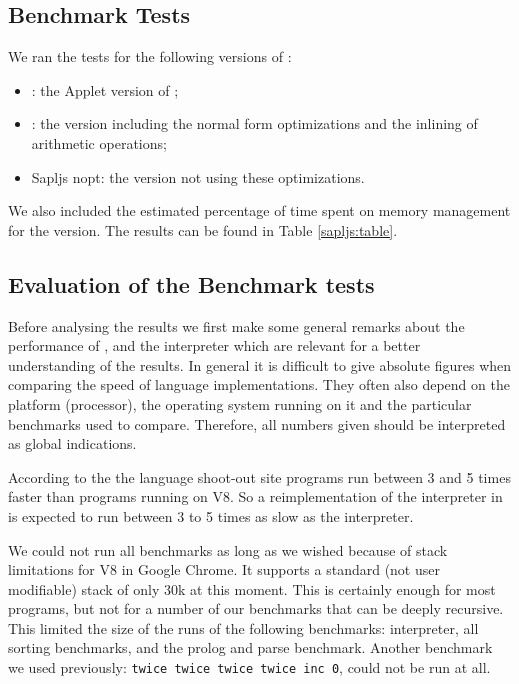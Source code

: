 \subsection{Benchmark Tests}
We ran the tests for the following versions of \Sapl: 
\begin{itemize}
\item{\Sapl}: the \Java Applet version of \Sapl;
\item{\Sapljs}: the \Sapljs version including the normal form optimizations and the inlining of arithmetic operations;
\item{\textsf{Sapljs nopt}}: the version not using these optimizations.
\end{itemize}
We also  included the estimated percentage of time spent on memory management for the \Sapljs version.
The results can be found in Table \ref{sapljs:table}.


\subsection{Evaluation of the Benchmark tests}
Before analysing the results we first make some general remarks about the performance of \Java, \JS and the \Sapl interpreter which are relevant for
a better understanding of the results. In general it is difficult to give absolute figures when comparing the speed of language implementations. 
They often also depend on the platform (processor), the operating system running on it and the particular benchmarks used to compare. 
Therefore, all numbers given should be interpreted as global indications. 

According to the the language shoot-out site \cite{SHOOTOUT} \Java 
programs run between 3 and 5 times faster than \JS programs running on V8. 
So a reimplementation of the \Sapl interpreter in \JS is expected to run between 3 to 5 times as slow as the \Sapl interpreter.

We could not run all benchmarks as long as we wished because of stack limitations for V8 \JS in Google Chrome. 
It supports a standard (not user modifiable) stack of only 30k at this moment.
This is certainly enough for most \JS programs, but not for a number of our benchmarks that can be deeply recursive. 
This limited the size of the runs of the following benchmarks: interpreter, all sorting benchmarks, and the prolog and parse benchmark. 
Another benchmark we used previously: \texttt{twice twice twice twice inc 0}, could not be run at all.

